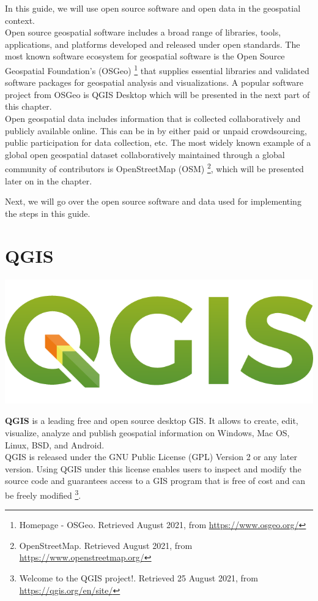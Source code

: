 \documentclass[
]{book}
\begin{document}
In this guide, we will use open source software and open data in the geospatial context.\\
Open source geospatial software includes a broad range of libraries, tools, applications, and platforms developed and released under open standards. The most known software ecosystem for geospatial software is the Open Source Geospatial Foundation's (OSGeo) \footnote{Homepage - OSGeo. Retrieved August 2021, from \url{https://www.osgeo.org/}} that supplies essential libraries and validated software packages for geospatial analysis and visualizations.
A popular software project from OSGeo is QGIS Desktop which will be presented in the next part of this chapter.\\
Open geospatial data includes information that is collected collaboratively and publicly available online. This can be in by either paid or unpaid crowdsourcing, public participation for data collection, etc. The most widely known example of a global open geospatial dataset collaboratively maintained through a global community of contributors is OpenStreetMap (OSM) \footnote{OpenStreetMap. Retrieved August 2021, from \url{https://www.openstreetmap.org/}}, which will be presented later on in the chapter.

Next, we will go over the open source software and data used for implementing the steps in this guide.

\hypertarget{qgis}{%
\section{QGIS}\label{qgis}}

\begin{center}\includegraphics[width=0.5\linewidth]{images/qgis_logo} \end{center}

\textbf{QGIS} is a leading free and open source desktop GIS. It allows to create, edit, visualize, analyze and publish geospatial information on Windows, Mac OS, Linux, BSD, and Android.\\
QGIS is released under the GNU Public License (GPL) Version 2 or any later version. Using QGIS under this license enables users to inspect and modify the source code and guarantees access to a GIS program that is free of cost and can be freely modified \footnote{Welcome to the QGIS project!. Retrieved 25 August 2021, from \url{https://qgis.org/en/site/}}.
\end{document}
